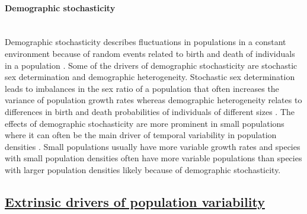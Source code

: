   

\paragraph*{Demographic stochasticity}\mbox{}\\ 
Demographic stochasticity describes fluctuations in populations in a constant environment because of random events related to birth and death of individuals in a population \parencite{roughgarden1975, melbourne2008}. Some of the drivers of demographic stochasticity are stochastic sex determination and demographic heterogeneity. Stochastic sex determination leads to imbalances in the sex ratio of a population that often increases the variance of population growth rates whereas demographic heterogeneity relates to differences in birth and death probabilities of individuals of different sizes \parencite{saether2004b,melbourne2008}. The effects of demographic stochasticity are more prominent in small populations where it can often be the main driver of temporal variability in population densities \parencite{lande1993, melbourne2008}. Small populations usually have more variable growth rates \parencite{willi2009} and species with small population densities often have more variable populations than species with larger population densities \parencite{gaston1990, reed2004} likely because of demographic stochasticity.

\subsection*{\textbf{\underline{Extrinsic drivers of population variability}}}

